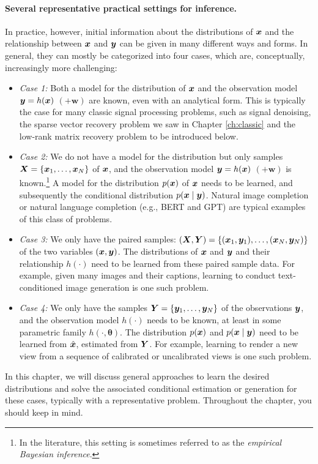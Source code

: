 \documentclass[../../book-main.tex]{subfiles}
\begin{document}
\paragraph{Several representative practical settings for inference.} 
In practice, however, initial information about the distributions of $\bm{x}$ and the relationship between $\bm{x}$ and $\bm{y}$ can be given in many different ways and forms. In general, they can mostly be categorized into four cases, which are, conceptually, increasingly more challenging:
\begin{itemize}
\item {\em Case 1:} Both a model for the distribution of $\bm{x}$ and the observation model $\bm{y} = h(\bm{x})$ $(+ \boldsymbol{w})$ are known, even with an analytical form. This is typically the case for many classic signal processing problems, such as signal denoising, the sparse vector recovery problem we saw in Chapter \ref{ch:classic} and the low-rank matrix recovery problem to be introduced below.
\item {\em Case 2:} We do not have a model for the distribution but only samples $\bm{X} = \{\bm{x}_1, \ldots, \bm{x}_N\}$ of $\bm{x}$, and the observation model $\bm{y} = h(\bm{x})$ $ (+ \boldsymbol{w})$ is known.\footnote{In the literature, this setting is sometimes referred to as the {\em empirical Bayesian inference}.} A model for the distribution $p(\bm{x})$ of $\bm{x}$ needs to be learned, and subsequently the conditional distribution $p(\bm{x}\mid \bm{y})$. Natural image completion or natural language completion (e.g., BERT and GPT) are typical examples of this class of problems.
\item {\em Case 3:} We only have the paired samples: $(\bm{X}, \bm{Y}) = \{ (\bm{x}_1, \bm{y}_1), \ldots, (\bm{x}_N, \bm{y}_N) \}$ of the two variables  $(\bm{x}, \bm{y})$. The distributions of $\bm{x}$ and $\bm{y}$ and their relationship $h(\cdot)$ need to be learned from these paired sample data. For example, given many images and their captions, learning to conduct text-conditioned image generation is one such problem. 
\item {\em Case 4:} We only have the samples $\bm{Y} = \{\bm{y}_1, \ldots, \bm{y}_N\}$ of the observations $\bm{y}$, and the observation model $h(\cdot)$ needs to be known, at least in some parametric family $h(\cdot, \boldsymbol{\theta})$. The distribution $p(\bm{x})$ and $p(\bm{x} \mid \bm{y})$ need to be learned from $\hat {\bm{x}}$, estimated from $\bm{Y}$. For example, learning to render a new view from a sequence of calibrated or uncalibrated views is one such problem.
\end{itemize}
In this chapter, we will discuss general approaches to learn the desired distributions and solve the associated conditional estimation or generation for these cases, typically with a representative problem.  Throughout the chapter, you should keep  in mind.
\end{document}
